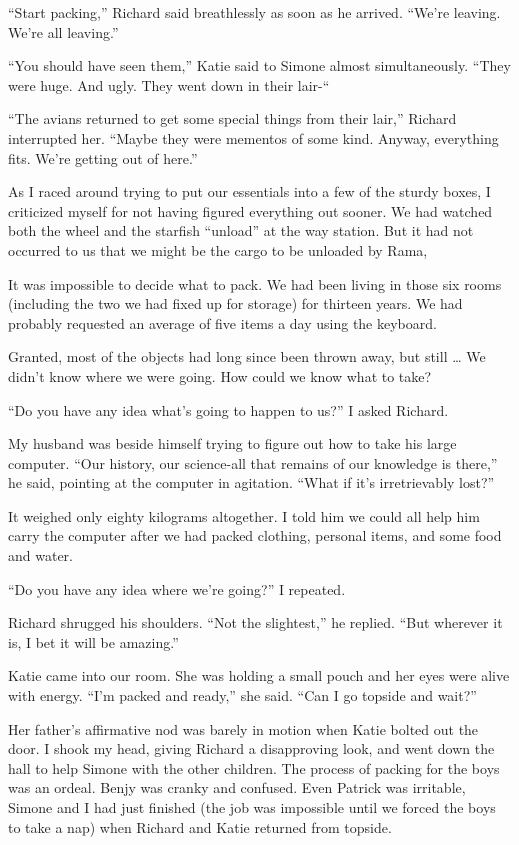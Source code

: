 \documentclass[]{article}
\begin{document}
{“Start packing,” Richard said breathlessly as soon as he arrived. “We’re leaving. We’re all leaving.”

“You should have seen them,” Katie said to Simone almost simultaneously. “They were huge. And ugly. They went down in their lair-“

“The avians returned to get some special things from their lair,” Richard interrupted her. “Maybe they were mementos of some kind. Anyway, everything fits. We’re getting out of here.”

As I raced around trying to put our essentials into a few of the sturdy boxes, I criticized myself for not having figured everything out sooner. We had watched both the wheel and the starfish “unload” at the way station. But it had not occurred to us that we might be the cargo to be unloaded by Rama,

It was impossible to decide what to pack. We had been living in those six rooms (including the two we had fixed up for storage) for thirteen years. We had probably requested an average of five items a day using the keyboard.

Granted, most of the objects had long since been thrown away, but still … We didn’t know where we were going. How could we know what to take?

“Do you have any idea what’s going to happen to us?” I asked Richard.

My husband was beside himself trying to figure out how to take his large computer. “Our history, our science-all that remains of our knowledge is there,” he said, pointing at the computer in agitation. “What if it’s irretrievably lost?”

It weighed only eighty kilograms altogether. I told him we could all help him carry the computer after we had packed clothing, personal items, and some food and water.

“Do you have any idea where we’re going?” I repeated.

Richard shrugged his shoulders. “Not the slightest,” he replied. “But wherever it is, I bet it will be amazing.”

Katie came into our room. She was holding a small pouch and her eyes were alive with energy. “I’m packed and ready,” she said. “Can I go topside and wait?”

Her father’s affirmative nod was barely in motion when Katie bolted out the door. I shook my head, giving Richard a disapproving look, and went down the hall to help Simone with the other children. The process of packing for the boys was an ordeal. Benjy was cranky and confused. Even Patrick was irritable, Simone and I had just finished (the job was impossible until we forced the boys to take a nap) when Richard and Katie returned from topside.

}
\end{document}
